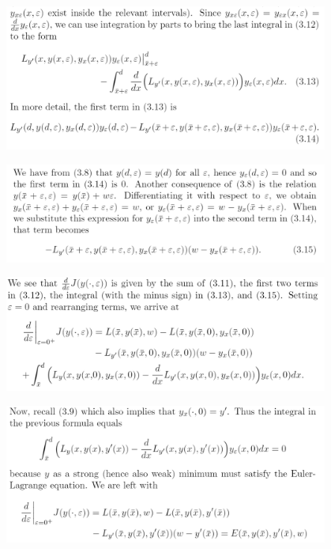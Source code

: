 \documentclass{beamer}
\begin{document}
    \begin{frame}
        \begin{figure}[!htb]
	\centering
	\includegraphics[width=0.95\textwidth]{ch3/Eq313314.png}
    \end{figure}
    \end{frame}
    \begin{frame}
        \begin{figure}[!htb]
	\centering
	\includegraphics[width=0.95\textwidth]{ch3/Eq315.png}
    \end{figure}
    \end{frame}
    \begin{frame}
        \begin{figure}[!htb]
	\centering
	\includegraphics[width=0.95\textwidth]{ch3/Eq315b.png}
    \end{figure}
    \end{frame}
    \begin{frame}
        \begin{figure}[!htb]
	\centering
	\includegraphics[width=0.95\textwidth]{ch3/Eq315c.png}
    \end{figure}
    \end{frame}
\end{document}
